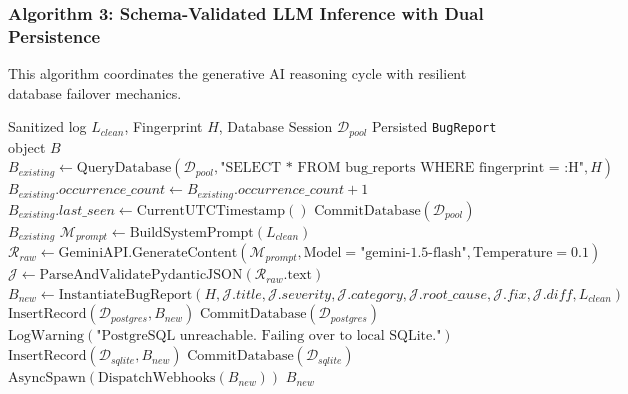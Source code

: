 \documentclass[12pt,a4paper]{article}
\begin{document}
\clearpage
\subsubsection{Algorithm 3: Schema-Validated LLM Inference with Dual Persistence}
This algorithm coordinates the generative AI reasoning cycle with resilient database failover mechanics.

\begin{algorithm}[H]
\caption{Generative AI Triage and Resilient Database Persistence}
\label{alg:ai_triage_persistence}
\begin{algorithmic}[1]
\Require Sanitized log $L_{clean}$, Fingerprint $H$, Database Session $\mathcal{D}_{pool}$
\Ensure Persisted \texttt{BugReport} object $B$
\State {}
\State $B_{existing} \gets \text{QueryDatabase}(\mathcal{D}_{pool}, \text{"SELECT * FROM bug\_reports WHERE fingerprint = :H"}, H)$
    \State $B_{existing}.occurrence\_count \gets B_{existing}.occurrence\_count + 1$
    \State $B_{existing}.last\_seen \gets \text{CurrentUTCTimestamp}()$
    \State $\text{CommitDatabase}(\mathcal{D}_{pool})$
    \State \Return $B_{existing}$
\EndIf
\State {}
\State $\mathcal{M}_{prompt} \gets \text{BuildSystemPrompt}(L_{clean})$
\State $\mathcal{R}_{raw} \gets \text{GeminiAPI}.\text{GenerateContent}(\mathcal{M}_{prompt}, \text{Model}=\text{"gemini-1.5-flash"}, \text{Temperature}=0.1)$
\State {}
\State $\mathcal{J} \gets \text{ParseAndValidatePydanticJSON}(\mathcal{R}_{raw}.\text{text})$
\State $B_{new} \gets \text{InstantiateBugReport}(H, \mathcal{J}.title, \mathcal{J}.severity, \mathcal{J}.category, \mathcal{J}.root\_cause, \mathcal{J}.fix, \mathcal{J}.diff, L_{clean})$
\Try
    \State {}
    \State $\text{InsertRecord}(\mathcal{D}_{postgres}, B_{new})$
    \State $\text{CommitDatabase}(\mathcal{D}_{postgres})$
    \State {}
    \State $\text{LogWarning}(\text{"PostgreSQL unreachable. Failing over to local SQLite."})$
    \State $\text{InsertRecord}(\mathcal{D}_{sqlite}, B_{new})$
    \State $\text{CommitDatabase}(\mathcal{D}_{sqlite})$
\EndTry
\State {}
\State $\text{AsyncSpawn}(\text{DispatchWebhooks}(B_{new}))$
\State \Return $B_{new}$
\end{algorithmic}
\end{algorithm}
\end{document}
